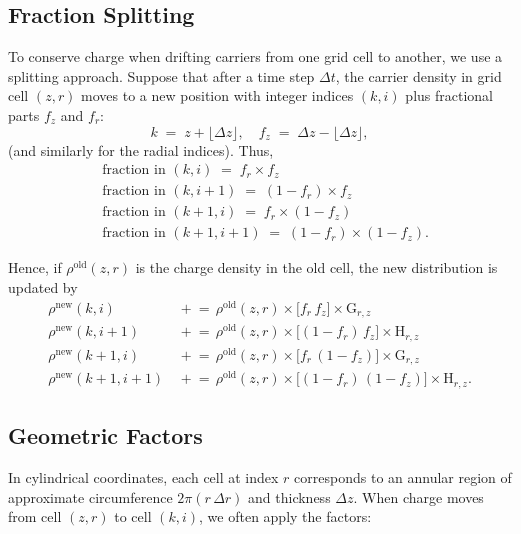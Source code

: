 \subsection{Fraction Splitting}\label{ch3:sec:frac_split}

To conserve charge when drifting carriers from one grid cell to another,
we use a splitting approach. Suppose
that after a time step $\Delta t$, the carrier density in grid cell $(z,r)$
moves to a new position with integer indices $(k,i)$ plus fractional parts
$f_z$ and $f_r$:
%
\[
k \;=\; z + \lfloor \Delta z \rfloor,\quad
f_z \;=\; \Delta z - \lfloor \Delta z \rfloor,
\]
(and similarly for the radial indices). Thus,
\begin{align}
&\text{fraction in }(k, i)   \;=\; f_{r} \times f_{z} \\
&\text{fraction in }(k, i+1) \;=\; (1 - f_{r}) \times f_{z}\\
&\text{fraction in }(k+1, i) \;=\; f_{r} \times (1 - f_{z})\\
&\text{fraction in }(k+1, i+1)\;=\; (1 - f_{r}) \times (1 - f_{z}).
\label{eq:bilinear-fractions}
\end{align}

Hence, if $\rho^{\mathrm{old}}(z,r)$ is the charge density in the old cell,
the new distribution is updated by
\begin{align}
\rho^{\mathrm{new}}(k,i)   &\,\mathrel{+}=\, \rho^{\mathrm{old}}(z,r)\times \bigl[f_{r}\,f_{z}\bigr] \times \text{G}_{r,z} \label{ch3:eq:den_update_1} \\
\rho^{\mathrm{new}}(k,i+1) &\,\mathrel{+}=\, \rho^{\mathrm{old}}(z,r)\times \bigl[(1 - f_{r})\,f_{z}\bigr] \times \text{H}_{r,z} \label{ch3:eq:den_update_2} \\
\rho^{\mathrm{new}}(k+1,i) &\,\mathrel{+}=\, \rho^{\mathrm{old}}(z,r)\times \bigl[f_{r}\,(1 - f_{z})\bigr] \times \text{G}_{r,z} \label{ch3:eq:den_update_3} \\
\rho^{\mathrm{new}}(k+1,i+1)&\,\mathrel{+}=\, \rho^{\mathrm{old}}(z,r)\times \bigl[(1 - f_{r})\,(1 - f_{z})\bigr] \times \text{H}_{r,z}. \label{ch3:eq:den_update_4}
\end{align}
\subsection{Geometric Factors}
\label{sec:geom-factor}

In cylindrical coordinates, each cell at index $r$ corresponds to an annular
region of approximate circumference $2\pi (r \,\Delta r)$ and thickness
$\Delta z$. When charge moves from cell $(z,r)$ to cell $(k,i)$, we
often apply the factors:

